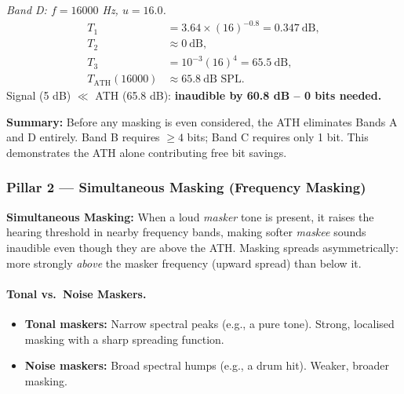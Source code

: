 \begin{examplebox}
\medskip
\noindent\textit{Band D: $f = 16000$ Hz, $u = 16.0$.}
\begin{align*}
T_1 &= 3.64 \times (16)^{-0.8} = 0.347\ \text{dB}, \\
T_2 &\approx 0\ \text{dB}, \\
T_3 &= 10^{-3}(16)^4 = 65.5\ \text{dB}, \\
T_{\text{ATH}}(16000) &\approx 65.8\ \text{dB SPL}.
\end{align*}
Signal (5 dB) $\ll$ ATH (65.8 dB): \textbf{inaudible by 60.8 dB -- 0 bits needed.}

\medskip
\noindent\textbf{Summary:} Before any masking is even considered, the ATH eliminates Bands A and D entirely. Band B requires $\geq 4$ bits; Band C requires only 1 bit. This demonstrates the ATH alone contributing free bit savings.
\end{examplebox}

\subsubsection{Pillar 2 --- Simultaneous Masking (Frequency Masking)}

\begin{definitionbox}
\textbf{Simultaneous Masking:} When a loud \emph{masker} tone is present, it raises the hearing threshold in nearby frequency bands, making softer \emph{maskee} sounds inaudible even though they are above the ATH. Masking spreads asymmetrically: more strongly \emph{above} the masker frequency (upward spread) than below it.
\end{definitionbox}

\paragraph{Tonal vs.\ Noise Maskers.}
\begin{itemize}[nosep]
    \item \textbf{Tonal maskers:} Narrow spectral peaks (e.g., a pure tone). Strong, localised masking with a sharp spreading function.
    \item \textbf{Noise maskers:} Broad spectral humps (e.g., a drum hit). Weaker, broader masking.
\end{itemize}

